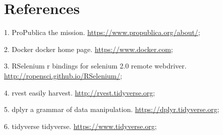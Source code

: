 \documentclass[10pt,letterpaper]{article}
\begin{document}
\section*{References}\label{references}

\hypertarget{refs}{}
\hypertarget{ref-ProPublica}{}
1. ProPublica the mission. \url{https://www.propublica.org/about/};

\hypertarget{ref-Docker}{}
2. Docker docker home page. \url{https://www.docker.com};

\hypertarget{ref-RSelenium}{}
3. RSelenium r bindings for selenium 2.0 remote webdriver.
\url{http://ropensci.github.io/RSelenium/};

\hypertarget{ref-rvest}{}
4. rvest easily harvest. \url{http://rvest.tidyverse.org};

\hypertarget{ref-dplyr}{}
5. dplyr a grammar of data manipulation.
\url{https://dplyr.tidyverse.org};

\hypertarget{ref-tidyverse}{}
6. tidyverse tidyverse. \url{https://www.tidyverse.org};

\nolinenumbers
\end{document}
